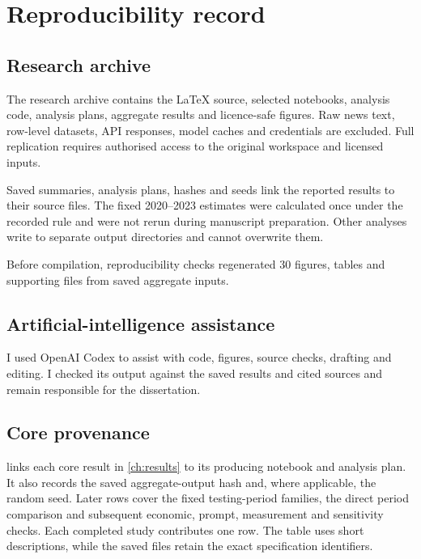 \chapter{Reproducibility record}
\label{app:reproducibility}

\section{Research archive}

The research archive contains the LaTeX source, selected notebooks, analysis
code, analysis plans, aggregate results and licence-safe figures. Raw news text,
row-level datasets, API responses, model caches and credentials are excluded.
Full replication requires authorised access to the original workspace and
licensed inputs.

Saved summaries, analysis plans, hashes and seeds link the reported results to
their source files. The fixed 2020--2023 estimates were calculated once under the
recorded rule and were not rerun during manuscript preparation. Other analyses
write to separate output directories and cannot overwrite them.

Before compilation, reproducibility checks regenerated 30 figures, tables and
supporting files from saved aggregate inputs.

\section{Artificial-intelligence assistance}

I used OpenAI Codex to assist with code, figures, source checks, drafting and
editing. I checked its output against the saved results and cited sources and
remain responsible for the dissertation.

\begin{landscape}
\section{Core provenance}

 links each core result in \cref{ch:results} to
its producing notebook and analysis plan. It also records the saved
aggregate-output hash and, where applicable, the random seed. Later rows cover
the fixed testing-period families, the direct period comparison and subsequent
economic, prompt, measurement and sensitivity checks. Each completed study
contributes one row. The table uses short descriptions, while the saved files
retain the exact specification identifiers.


\end{landscape}
